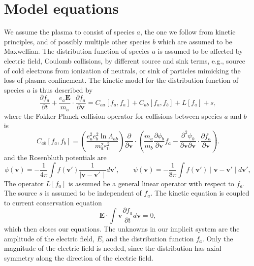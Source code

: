 \documentclass[preprint]{revtex4}
\begin{document}
\section{Model equations}
We assume the plasma to consist of species $a$, the one we follow from kinetic principles, and of possibly multiple other species $b$ which are assumed to be Maxwellian. The distribution function of species $a$ is assumed to be affected by electric field, Coulomb collisions, by different source and sink terms, e.g., source of cold electrons from ionization of neutrals, or sink of particles mimicking the loss of plasma confinement. The kinetic model for the distribution function of species $a$ is thus described by 
\begin{equation}
\frac{\partial f_a}{\partial t} + \frac{e_a\bm{E}}{m_a}\cdot\frac{\partial f_a}{\partial\bm{v}}= C_{aa}[f_a,f_a]+C_{ab}[f_a,f_b]+L[f_a]+s,
\end{equation}
where the Fokker-Planck collision operator for collisions between species $a$ and $b$ is 
\begin{equation}
C_{ab}[f_a,f_b]=\left(\frac{e_a^2e_b^2\ln\Lambda_{ab}}{m_a^2\varepsilon_0^2}\right)\frac{\partial}{\partial\bm{v}}\cdot\left(\frac{m_a}{m_b}\frac{\partial\phi_b}{\partial\bm{v}} f_a-\frac{\partial^2\psi_b}{\partial\bm{v}\partial\bm{v}}\cdot\frac{\partial f_a}{\partial\bm{v}}\right).
\end{equation}
and the Rosenbluth potentials are
\begin{equation}
\phi(\bm{v})=-\frac{1}{4\pi}\int f(\bm{v}')\frac{1}{\mid \bm{v}-\bm{v}'\mid}d\bm{v}',\qquad \psi(\bm{v})=-\frac{1}{8\pi}\int f(\bm{v}')\mid \bm{v}-\bm{v}'\mid d\bm{v}',
\end{equation}
The operator $L[f_a]$ is assumed be a general linear operator with respect to $f_a$. The source $s$ is assumed to be independent of $f_a$. The kinetic equation is coupled to current conservation equation
\begin{equation}
\bm{E}\cdot\int \bm{v}\frac{\partial f_a}{\partial t}d\bm{v}=0,
\end{equation}
which then closes our equations. The unknowns in our implicit system are the amplitude of the electric field, $E$, and the distribution function $f_a$. Only the magnitude of the electric field is needed, since the distribution has axial symmetry along the direction of the electric field.
\end{document}
